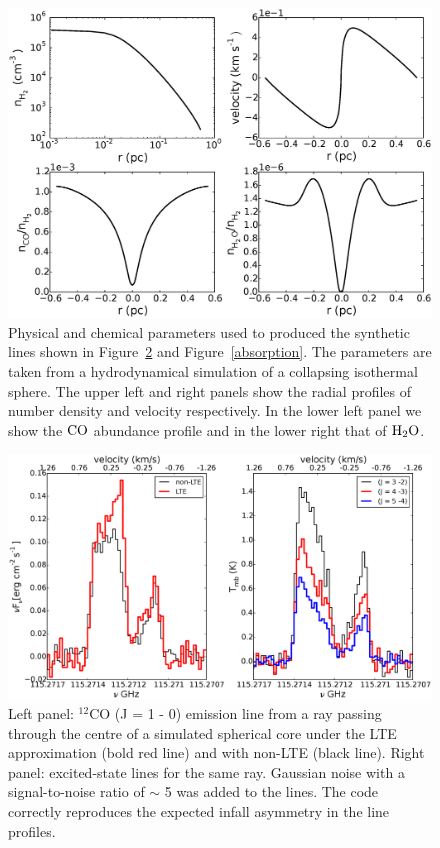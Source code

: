 \documentclass{mn2e}
\begin{document}
\begin{figure}
\includegraphics[width=1.0\columnwidth, clip]{sphmodel.eps}
\caption{Physical and chemical parameters used to produced the synthetic lines shown in Figure~\ref{co_example_sph} and Figure~\ref{absorption}. The parameters are taken from a hydrodynamical simulation of a collapsing isothermal sphere. The upper left and right panels show the radial profiles of number density and velocity respectively. In the lower left panel we show the $\rm{CO}$ abundance profile and in the lower right that of $\rm{H_2O}$. 
\label{sph_physical_params}}
\end{figure}


\begin{figure}
\includegraphics[width=1.0\columnwidth, clip]{co_example_sph.eps}
\caption{Left panel: $^{12}$CO (J = 1 - 0) emission line from a ray passing through the centre of a simulated spherical core under the LTE approximation (bold red line) and with non-LTE (black line). Right panel: excited-state lines for the same ray. Gaussian noise with a signal-to-noise ratio of $\sim$ 5 was added to the lines. The code correctly reproduces the expected infall asymmetry in the line profiles.
\label{co_example_sph}}
\end{figure}
\end{document}
